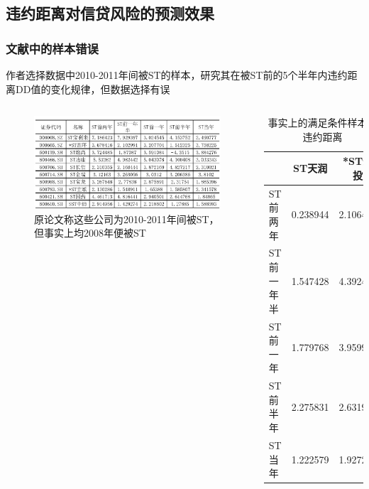 \documentclass{ctexbeamer}
\begin{document}
\subsection{违约距离对信贷风险的预测效果}
\begin{frame}
    \frametitle{文献中的样本错误}
    作者选择数据中2010-2011年间被ST的样本，研究其在被ST前的5个半年内违约距离DD值的变化规律，但数据选择有误
    \begin{columns}[c]
        \begin{figure}[H]
            \includegraphics[width=\linewidth]{img/dd_origin.jpeg}
            \caption{原论文称这些公司为2010-2011年间被ST，但事实上均2008年便被ST}
        \end{figure}
        \begin{table}[H]
            \centering
            \tiny\begin{tabular}{lcc}
                \toprule
                       & ST天润     & *ST云投    \\
                \midrule
                ST前两年  & 0.238944 & 2.106469 \\
                ST前一年半 & 1.547428 & 4.392480 \\
                ST前一年  & 1.779768 & 3.959906 \\
                ST前半年  & 2.275831 & 2.631978 \\
                ST当年   & 1.222579 & 1.927210 \\
                \bottomrule
            \end{tabular}
            \caption{事实上的满足条件样本的违约距离}
        \end{table}
    \end{columns}
\end{frame}
\end{document}
